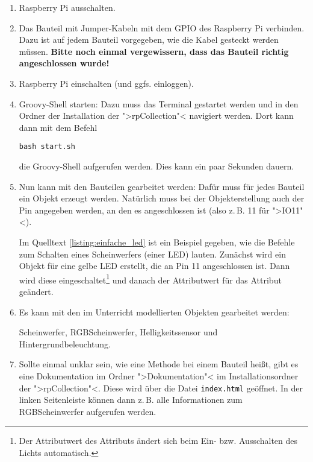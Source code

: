 \documentclass[11pt, a4paper]{article}
\begin{document}
\begin{enumerate}

\item Raspberry Pi ausschalten.

\item Das Bauteil mit Jumper-Kabeln mit dem GPIO des Raspberry Pi verbinden. Dazu ist auf jedem Bauteil vorgegeben, wie die Kabel gesteckt werden müssen. \textbf{Bitte noch einmal vergewissern, dass das Bauteil richtig angeschlossen wurde!}

\item Raspberry Pi einschalten (und ggfs. einloggen).

\item Groovy-Shell starten: Dazu muss das Terminal gestartet werden und in den Ordner der Installation der ">rpCollection"< navigiert werden. Dort kann dann mit dem Befehl
\lstset{language=Bash}
\bashstyle 
\begin{lstlisting}
bash start.sh
\end{lstlisting}
die Groovy-Shell aufgerufen werden. Dies kann ein paar Sekunden dauern.

\item Nun kann mit den Bauteilen gearbeitet werden: Dafür muss für jedes Bauteil ein Objekt erzeugt werden. Natürlich muss bei der Objekterstellung auch der Pin angegeben werden, an den es angeschlossen ist (also z.\,B. 11 für ">IO11"<).

Im Quelltext \ref{listing:einfache_led} ist ein Beispiel gegeben, wie die Befehle zum Schalten eines Scheinwerfers (einer LED) lauten. Zunächst wird ein Objekt für eine gelbe LED erstellt, die an Pin 11 angeschlossen ist. Dann wird diese eingeschaltet\footnote{Der Attributwert des Attributs  ändert sich beim Ein- bzw. Ausschalten des Lichts automatisch.} und danach der Attributwert für das Attribut  geändert.
\item Es kann mit den im Unterricht modellierten Objekten gearbeitet werden: 

Scheinwerfer, RGBScheinwerfer, Helligkeitssensor und Hintergrundbeleuchtung.

\item Sollte einmal unklar sein, wie eine Methode bei einem Bauteil heißt, gibt es eine Dokumentation im Ordner ">Dokumentation"< im Installationsordner der ">rpCollection"<. Diese wird über die Datei \texttt{index.html} geöffnet. In der linken Seitenleiste können dann z.\,B. alle Informationen zum RGBScheinwerfer aufgerufen werden.  

\end{enumerate}
\end{document}
